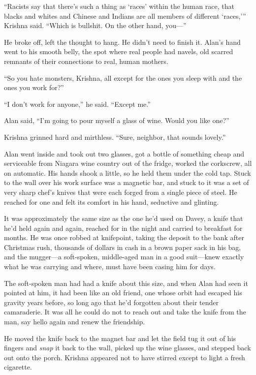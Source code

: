 \documentclass{article}
\begin{document}
``Racists say that there's such a thing as `races' within the human
race, that blacks and whites and Chinese and Indians are all members
of different `races,''' Krishna said.  ``Which is bullshit.  On the
other hand, you---''

He broke off, left the thought to hang.  He didn't need to finish it. 
Alan's hand went to his smooth belly, the spot where real people had
navels, old scarred remnants of their connections to real, human
mothers.

``So you hate monsters, Krishna, all except for the ones you sleep
with and the ones you work for?''

``I don't work for anyone,'' he said.  ``Except me.''

Alan said, ``I'm going to pour myself a glass of wine.  Would you like
one?''

Krishna grinned hard and mirthless.  ``Sure, neighbor, that sounds
lovely.''

Alan went inside and took out two glasses, got a bottle of something
cheap and serviceable from Niagara wine country out of the fridge,
worked the corkscrew, all on automatic.  His hands shook a little, so
he held them under the cold tap.  Stuck to the wall over his work
surface was a magnetic bar, and stuck to it was a set of very sharp
chef's knives that were each forged from a single piece of steel.  He
reached for one and felt its comfort in his hand, seductive and
glinting.

It was approximately the same size as the one he'd used on Davey, a
knife that he'd held again and again, reached for in the night and
carried to breakfast for months.  He was once robbed at knifepoint,
taking the deposit to the bank after Christmas rush, thousands of
dollars in cash in a brown paper sack in his bag, and the mugger---a
soft-spoken, middle-aged man in a good suit---knew exactly what he was
carrying and where, must have been casing him for days.

The soft-spoken man had had a knife about this size, and when Alan had
seen it pointed at him, it had been like an old friend, one whose
orbit had escaped his gravity years before, so long ago that he'd
forgotten about their tender camaraderie.  It was all he could do not
to reach out and take the knife from the man, say hello again and
renew the friendship.

He moved the knife back to the magnet bar and let the field tug it out
of his fingers and \textit{snap} it back to the wall, picked up the
wine glasses, and stepped back out onto the porch.  Krishna appeared
not to have stirred except to light a fresh cigarette.
\end{document}
